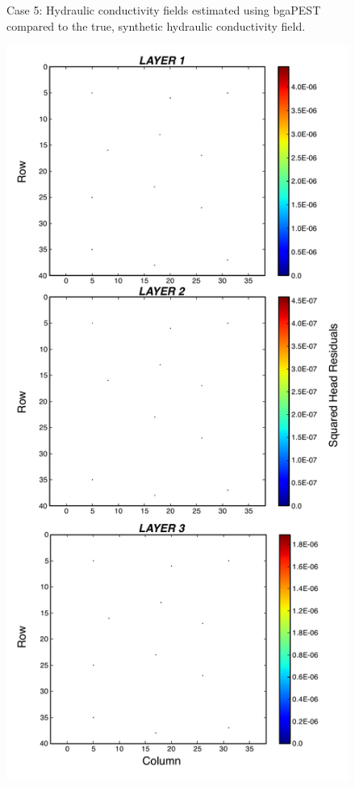 \documentclass[11pt,oneside,onecolumn]{usgsreport}
\begin{document}
\begin{appendix}
\begin{figure}[H]
\caption{\label{fig:3LK_case5}Case 5: Hydraulic conductivity fields estimated
using bgaPEST compared to the true, synthetic hydraulic conductivity
field.}
\end{figure}


\begin{figure}[H]
\begin{center}\includegraphics[scale=0.5]{figures/3L_resid_case5}\end{center}


\end{figure}
\end{appendix}
\end{document}
